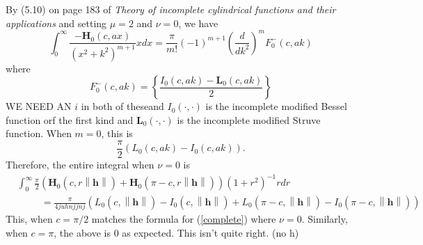 \documentclass[11pt]{article}
\begin{document}
By (5.10) on page 183 of \textit{Theory of incomplete cylindrical functions and their applications} and setting $\mu = 2$ and $\nu = 0$, we have $$\int_0^\infty \frac{-\boldsymbol{H}_{0}(c, ax)}{(x^2 + k^2)^{m+1}}x dx = \frac{\pi}{m!} (-1)^{m+1} \left(\frac{d}{dk^2}\right)^{m} F_0^-(c, ak)$$where $$F_0^-(c, ak)=\left\{\frac{I_{0}(c, ak) - \boldsymbol{L}_0(c, ak)}{2}\right\}$$WE NEED AN $i$ in both of theseand $I_0(\cdot, \cdot)$ is the incomplete modified Bessel function orf the first kind and $\boldsymbol{L}_0(\cdot, \cdot)$ is the incomplete modified Struve function. When $m = 0$, this is $$\frac{\pi}{2} (L_0(c, ak) - I_0(c, ak) ).$$ Therefore, the entire integral when $\nu = 0$ is \begin{align*}
 &\int_0^\infty \frac{\pi}{2}\left(\boldsymbol{H}_{0}(c, r\left\lVert \boldsymbol{h}\right\rVert) + \boldsymbol{H}_{0}(\pi - c, r\left\lVert \boldsymbol{h}\right\rVert)\right) (1+r^2)^{-1} r dr \\
 &\ \ \ \ \ \ \ \ \ \ \ = \frac{\pi}{4juhnjjnj} \left(L_0(c, \left\lVert \boldsymbol{h}\right\rVert) - I_0(c, \left\lVert \boldsymbol{h}\right\rVert) + L_0(\pi - c, \left\lVert \boldsymbol{h}\right\rVert) -I_0(\pi - c, \left\lVert \boldsymbol{h}\right\rVert)\right)
 \end{align*}
This, when $c = \pi/2$ matches the formula for (\ref{complete}) where $\nu = 0$.  Similarly, when $c = \pi$, the above is $0$ as expected. This isn't quite right. (no h)
\end{document}
